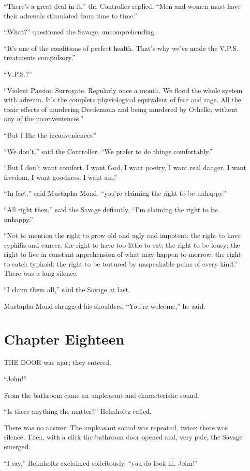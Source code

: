 \documentclass[12pt]{report}
\newcommand{\mychapter}[2]{
\setcounter{chapter}{#1}
    \setcounter{section}{0}
    \chapter*{#2}
    \addcontentsline{toc}{chapter}{#2}
}
\begin{document}
``There's a great deal in it,'' the Controller replied. ``Men and women
must have their adrenals stimulated from time to time.''

``What?'' questioned the Savage, uncomprehending.

``It's one of the conditions of perfect health. That's why we've made
the V.P.S. treatments compulsory.''

``V.P.S.?''

``Violent Passion Surrogate. Regularly once a month. We flood the whole
system with adrenin. It's the complete physiological equivalent of fear
and rage. All the tonic effects of murdering Desdemona and being
murdered by Othello, without any of the inconveniences.''

``But I like the inconveniences.''

``We don't,'' said the Controller. ``We prefer to do things
comfortably.''

``But I don't want comfort. I want God, I want poetry, I want real
danger, I want freedom, I want goodness. I want sin.''

``In fact,'' said Mustapha Mond, ``you're claiming the right to be
unhappy.''

``All right then,'' said the Savage defiantly, ``I'm claiming the right
to be unhappy.''

``Not to mention the right to grow old and ugly and impotent; the right
to have syphilis and cancer; the right to have too little to eat; the
right to be lousy; the right to live in constant apprehension of what
may happen to-morrow; the right to catch typhoid; the right to be
tortured by unspeakable pains of every kind.'' There was a long silence.

``I claim them all,'' said the Savage at last.

Mustapha Mond shrugged his shoulders. ``You're welcome,'' he said.

\mychapter{18}{Chapter Eighteen}
THE DOOR was ajar; they entered.

``John!''

From the bathroom came an unpleasant and characteristic sound.

``Is there anything the matter?'' Helmholtz called.

There was no answer. The unpleasant sound was repeated, twice; there was
silence. Then, with a click the bathroom door opened and, very pale, the
Savage emerged.

``I say,'' Helmholtz exclaimed solicitously, ``you do look ill, John!''
\end{document}
